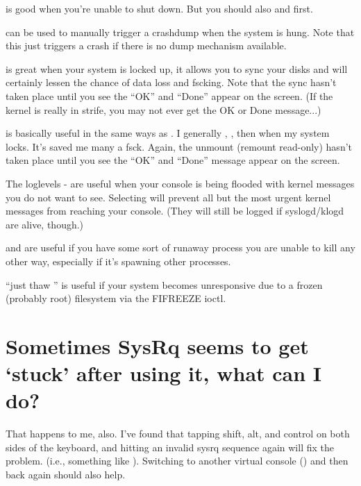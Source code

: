 \documentclass[a4paper,8pt,english]{sphinxmanual}
\begin{document}
 is good when you're unable to shut down. But you should also
 and  first.

 can be used to manually trigger a crashdump when the system is hung.
Note that this just triggers a crash if there is no dump mechanism available.

 is great when your system is locked up, it allows you to sync your
disks and will certainly lessen the chance of data loss and fscking. Note
that the sync hasn't taken place until you see the ``OK'' and ``Done'' appear
on the screen. (If the kernel is really in strife, you may not ever get the
OK or Done message...)

 is basically useful in the same ways as . I generally
, , then  when my system locks. It's saved
me many a fsck. Again, the unmount (remount read-only) hasn't taken place until
you see the ``OK'' and ``Done'' message appear on the screen.

The loglevels - are useful when your console is being flooded with
kernel messages you do not want to see. Selecting  will prevent all but
the most urgent kernel messages from reaching your console. (They will
still be logged if syslogd/klogd are alive, though.)

 and  are useful if you have some sort of runaway process
you are unable to kill any other way, especially if it's spawning other
processes.

``just thaw '' is useful if your system becomes unresponsive due to a
frozen (probably root) filesystem via the FIFREEZE ioctl.


\section{Sometimes SysRq seems to get `stuck' after using it, what can I do?}
\label{admin-guide/sysrq:sometimes-sysrq-seems-to-get-stuck-after-using-it-what-can-i-do}
That happens to me, also. I've found that tapping shift, alt, and control
on both sides of the keyboard, and hitting an invalid sysrq sequence again
will fix the problem. (i.e., something like ). Switching to
another virtual console () and then back again should also help.
\end{document}
